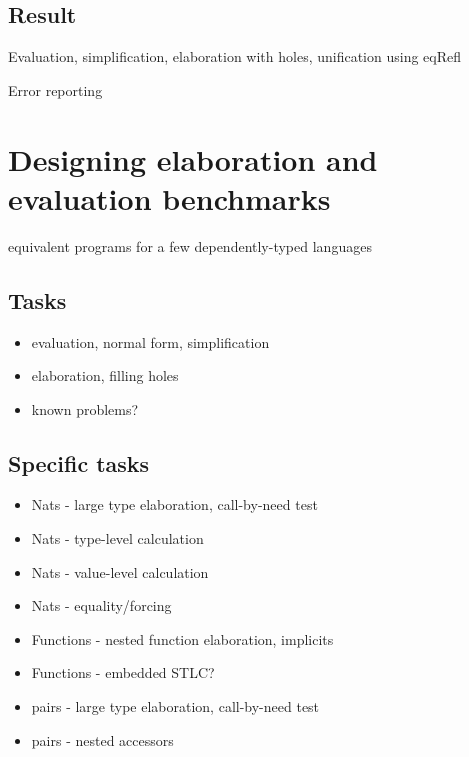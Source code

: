 \documentclass[english,zadani,odsaz]{fitthesis}
\begin{document}

\section{Result}
\label{sec:orgcb63eb2}

Evaluation, simplification, elaboration with holes, unification using eqRefl

Error reporting

\chapter{Designing elaboration and evaluation benchmarks}
\label{sec:org5be75a2}
equivalent programs for a few dependently-typed languages




\section{Tasks}
\label{sec:orga159793}
\begin{itemize}
\item evaluation, normal form, simplification
\item elaboration, filling holes
\item known problems?
\end{itemize}

\section{Specific tasks}
\label{sec:org02a58f8}
\begin{itemize}
\item Nats - large type elaboration, call-by-need test
\item Nats - type-level calculation
\item Nats - value-level calculation
\item Nats - equality/forcing
\item Functions - nested function elaboration, implicits
\item Functions - embedded STLC?
\item pairs - large type elaboration, call-by-need test
\item pairs - nested accessors
\end{itemize}
\end{document}
